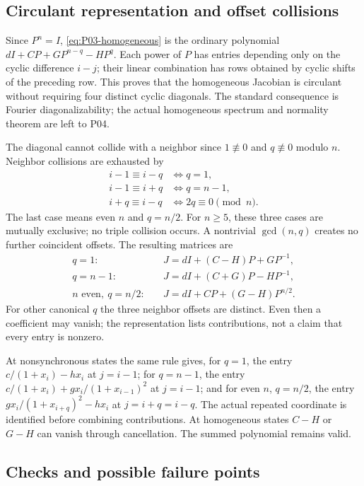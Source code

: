 \subsection{Circulant representation and offset collisions}

Since $P^n=I$, \eqref{eq:P03-homogeneous} is the ordinary polynomial
$dI+CP+GP^{n-q}-HP^q$. Each power of $P$ has entries depending
only on the cyclic difference $i-j$; their linear combination has
rows obtained by cyclic shifts of the preceding row. This proves
that the homogeneous Jacobian is circulant without requiring four
distinct cyclic diagonals. The standard consequence is Fourier
 diagonalizability; the actual homogeneous spectrum and normality
 theorem are left to P04.

The diagonal cannot collide with a neighbor since $1\not\equiv0$
and $q\not\equiv0$ modulo $n$. Neighbor collisions are exhausted by
\[
\begin{aligned}
 i-1\equiv i-q&\iff q=1,\\
 i-1\equiv i+q&\iff q=n-1,\\
 i+q\equiv i-q&\iff 2q\equiv0\pmod n.
\end{aligned}
\]
The last case means even $n$ and $q=n/2$. For $n\ge5$, these
three cases are mutually exclusive; no triple collision occurs.
A nontrivial $\gcd(n,q)$ creates no further coincident offsets.
The resulting matrices are
\begin{align}
 q=1:&\quad J=dI+(C-H)P+GP^{-1},
    \label{eq:P03-collision-one}\\
 q=n-1:&\quad J=dI+(C+G)P-HP^{-1},
    \label{eq:P03-collision-last}\\
 n\text{ even},\ q=n/2:&\quad J=dI+CP+(G-H)P^{n/2}.
    \label{eq:P03-collision-half}
\end{align}
For other canonical $q$ the three neighbor offsets are distinct.
Even then a coefficient may vanish; the representation lists
contributions, not a claim that every entry is nonzero.

At nonsynchronous states the same rule gives, for $q=1$, the
entry $c/(1+x_i)-h x_i$ at $j=i-1$; for $q=n-1$, the entry
$c/(1+x_i)+g x_i/(1+x_{i-1})^2$ at $j=i-1$; and for even $n$,
$q=n/2$, the entry $g x_i/(1+x_{i+q})^2-h x_i$ at
$j=i+q=i-q$. The actual repeated coordinate is identified before
combining contributions. At homogeneous states $C-H$ or $G-H$
can vanish through cancellation. The summed polynomial remains valid.

\subsection{Checks and possible failure points}
\label{subsec:P03-checks}

